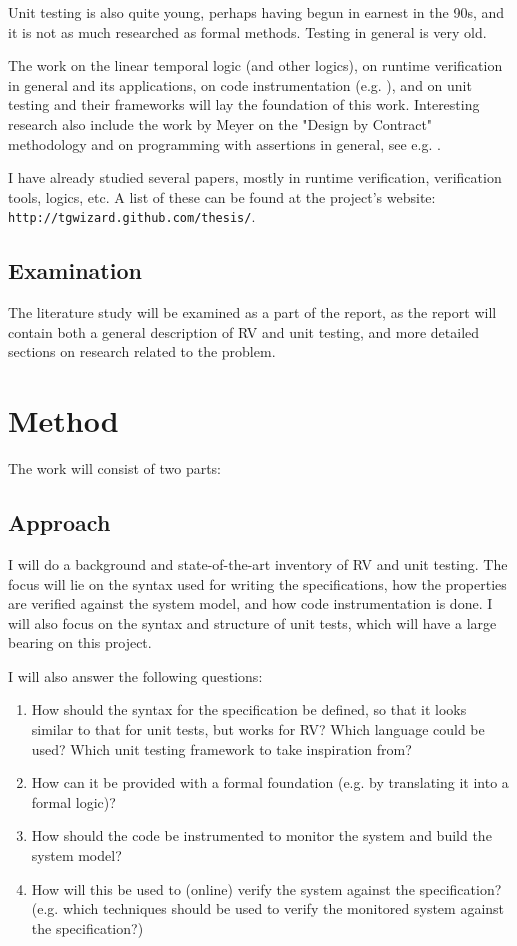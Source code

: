 \documentclass[a4paper,11pt]{article}
\begin{document}
Unit testing is also quite young, perhaps having begun in earnest in the 90s, and it is not as much researched as formal methods. Testing in general is very old.

The work on the linear temporal logic (and other logics), on runtime verification in general and its applications, on code instrumentation (e.g. \cite{aspectj,matusiak09}), and on unit testing and their frameworks will lay the foundation of this work. Interesting research also include the work by Meyer on the "Design by Contract" methodology \cite{meyer92} and on programming with assertions in general, see e.g. \cite{rosenblum95,bartetzko01}.

I have already studied several papers, mostly in runtime verification, verification tools, logics, etc.
A list of these can be found at the project's website: \texttt{http://tgwizard.github.com/thesis/}.

\subsection{Examination}

The literature study will be examined as a part of the report, as the report will contain
both a general description of RV and unit testing, and more detailed sections on research related to the problem.


\section{Method}

The work will consist of two parts:


\subsection{Approach}

I will do a background and state-of-the-art inventory of RV and unit testing.
The focus will lie on the syntax used for writing the specifications, how the
properties are verified against the system model, and how code instrumentation
is done. I will also focus on the syntax and structure of unit tests, which will have a large bearing on this project.

I will also answer the following questions:

\begin{enumerate}
	\item How should the syntax for the specification be defined,
		so that it looks similar to that for unit tests, but works for RV?
		Which language could be used? Which unit testing framework to take inspiration from?
    \item How can it be provided with a formal foundation (e.g. by translating
        it into a formal logic)?
	\item How should the code be instrumented to monitor the system and build the system model?
	\item How will this be used to (online) verify the system against the
        specification? (e.g. which techniques should be used to verify the
        monitored system against the specification?)
\end{enumerate}
\end{document}
